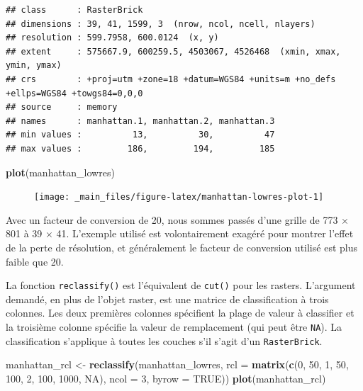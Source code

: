 \documentclass[]{book}
\newenvironment{Shaded}{\begin{snugshade}}{\end{snugshade}}
\newcommand{\DataTypeTok}[1]{\textcolor[rgb]{0.13,0.29,0.53}{#1}}
\newcommand{\DecValTok}[1]{\textcolor[rgb]{0.00,0.00,0.81}{#1}}
\newcommand{\KeywordTok}[1]{\textcolor[rgb]{0.13,0.29,0.53}{\textbf{#1}}}
\newcommand{\NormalTok}[1]{#1}
\newcommand{\OtherTok}[1]{\textcolor[rgb]{0.56,0.35,0.01}{#1}}
\newcommand{\StringTok}[1]{\textcolor[rgb]{0.31,0.60,0.02}{#1}}
\begin{document}
\begin{verbatim}
## class      : RasterBrick 
## dimensions : 39, 41, 1599, 3  (nrow, ncol, ncell, nlayers)
## resolution : 599.7958, 600.0124  (x, y)
## extent     : 575667.9, 600259.5, 4503067, 4526468  (xmin, xmax, ymin, ymax)
## crs        : +proj=utm +zone=18 +datum=WGS84 +units=m +no_defs +ellps=WGS84 +towgs84=0,0,0 
## source     : memory
## names      : manhattan.1, manhattan.2, manhattan.3 
## min values :          13,          30,          47 
## max values :         186,         194,         185
\end{verbatim}

\begin{Shaded}
\begin{Highlighting}[]
\KeywordTok{plot}\NormalTok{(manhattan_lowres)}
\end{Highlighting}
\end{Shaded}

\begin{figure}

{\centering \texttt{[image: \_main\_files/figure-latex/manhattan-lowres-plot-1]} 

}

\caption{ }\label{fig:manhattan-lowres-plot}
\end{figure}

Avec un facteur de conversion de 20, nous sommes passés d'une grille de
773 \(\times\) 801 à 39 \(\times\) 41. L'exemple utilisé est
volontairement exagéré pour montrer l'effet de la perte de résolution,
et généralement le facteur de conversion utilisé est plus faible que 20.

La fonction \texttt{reclassify()} est l'équivalent de \texttt{cut()}
pour les rasters. L'argument demandé, en plus de l'objet raster, est une
matrice de classification à trois colonnes. Les deux premières colonnes
spécifient la plage de valeur à classifier et la troisième colonne
spécifie la valeur de remplacement (qui peut être \texttt{NA}). La
classification s'applique à toutes les couches s'il s'agit d'un
\texttt{RasterBrick}.

\begin{Shaded}
\begin{Highlighting}[]
\NormalTok{manhattan_rcl <-}\StringTok{ }\KeywordTok{reclassify}\NormalTok{(manhattan_lowres, }\DataTypeTok{rcl =} \KeywordTok{matrix}\NormalTok{(}\KeywordTok{c}\NormalTok{(}\DecValTok{0}\NormalTok{, }\DecValTok{50}\NormalTok{, }\DecValTok{1}\NormalTok{,}
                                                             \DecValTok{50}\NormalTok{, }\DecValTok{100}\NormalTok{, }\DecValTok{2}\NormalTok{,}
                                                             \DecValTok{100}\NormalTok{, }\DecValTok{1000}\NormalTok{, }\OtherTok{NA}\NormalTok{),}
                                                           \DataTypeTok{ncol =} \DecValTok{3}\NormalTok{, }\DataTypeTok{byrow =} \OtherTok{TRUE}\NormalTok{))}
\KeywordTok{plot}\NormalTok{(manhattan_rcl)}
\end{Highlighting}
\end{Shaded}
\end{document}
